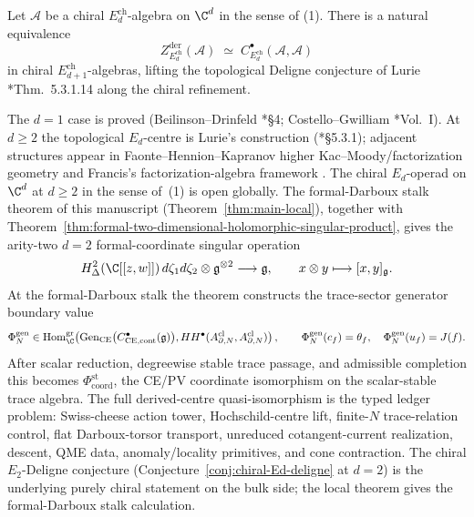 \begin{conj}\label{conj:chiral-Ed-deligne}
  Let $\mathcal A$ be a chiral $E_d^{\mathrm{ch}}$-algebra on $\C^d$
  in the sense of (1).  There is a natural equivalence
  \[
    Z^{\mathrm{der}}_{E_d^{\mathrm{ch}}}(\mathcal A)
    \;\simeq\;
    C^\bullet_{E_d^{\mathrm{ch}}}(\mathcal A,\mathcal A)
  \]
  in chiral $E_{d+1}^{\mathrm{ch}}$-algebras, lifting the
  topological Deligne conjecture of Lurie
  \cite{lurie-ha}*{Thm.~5.3.1.14} along the chiral refinement.
\end{conj}

The $d=1$ case is proved (Beilinson--Drinfeld
\cite{beilinson-drinfeld-chiral}*{\S 4}; Costello--Gwilliam
\cite{costello-gwilliam}*{Vol.~I}).  At $d\geq 2$ the topological
$E_d$-centre is Lurie's construction
(\cite{lurie-ha}*{\S 5.3.1}); adjacent structures appear in
Faonte--Hennion--Kapranov higher Kac--Moody/factorization geometry
\cite{faonte-hennion-kapranov-higher-km} and Francis's
factorization-algebra framework \cite{francis-thesis}.  The chiral
$E_d$-operad on $\C^d$ at $d\geq 2$ in the sense of~(1) is open
globally.  The formal-Darboux stalk theorem of this
manuscript (Theorem~\ref{thm:main-local}), together with
Theorem~\ref{thm:formal-two-dimensional-holomorphic-singular-product}, gives the
arity-two \(d=2\) formal-coordinate singular operation
\[
  H^2_\Delta(\C[[z,w]])\,d\zeta_1d\zeta_2
  \otimes\mathfrak g^{\otimes2}\longrightarrow\mathfrak g,\qquad
  x\otimes y\longmapsto [x,y]_{\mathfrak g}.
\]
At the formal-Darboux stalk the theorem constructs the trace-sector
generator boundary value
\[
  \Phi_N^{\mathrm{gen}}\in
  \operatorname{Hom}^{\mathrm{gr}}_\C\!\left(
  \operatorname{Gen}_{\mathrm{CE}}
  \bigl(C^\bullet_{\mathrm{CE},\mathrm{cont}}(\mathfrak g)\bigr),
  HH^\bullet(A^{\mathrm{cl}}_{\partial,N},
             A^{\mathrm{cl}}_{\partial,N})
  \right),
  \qquad
  \Phi_N^{\mathrm{gen}}(c_f)=\theta_f,\quad
  \Phi_N^{\mathrm{gen}}(u_f)=J(f).
\]
After scalar reduction, degreewise stable trace passage, and admissible
completion this becomes
\(\Phi_{\mathrm{coord}}^{\mathrm{st}}\), the CE/PV coordinate
isomorphism on the scalar-stable trace algebra.  The full
derived-centre quasi-isomorphism is the typed ledger problem:
Swiss-cheese action tower, Hochschild-centre lift, finite-\(N\)
trace-relation control, flat Darboux-torsor transport, unreduced
cotangent-current realization, descent, QME data, anomaly/locality
primitives, and cone contraction.
The chiral $E_2$-Deligne conjecture
(Conjecture~\ref{conj:chiral-Ed-deligne} at $d=2$) is the underlying
purely chiral statement on the bulk side; the local theorem gives the
formal-Darboux stalk calculation.

